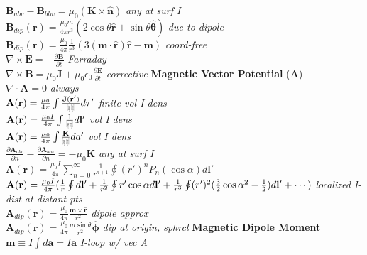 \documentclass[9pt]{extarticle}
\def\rcurs{{\mbox{$\resizebox{.09in}{.08in}{\texttt{[image: ScriptR]}}$}}}
\begin{document}
\begin{multicols}{3}
$\mathbf{B}_{abv} - \mathbf{B}_{blw} = \mu_{0}(\mathbf{K}\times\mathbf{\hat{n}})$ \textit{any at surf I} \\
$\mathbf{B}_{dip}(\mathbf{r}) = \frac{\mu_{0}m}{4\pi r^{3}}(2\cos{\theta}\mathbf{\hat{r}} + \sin{\theta}\mathbf{\hat{\theta}})$ \textit{due to dipole} \\
$\mathbf{B}_{dip}(\mathbf{r}) = \frac{\mu_{0}}{4\pi}\frac{1}{r^{3}}(3(\mathbf{m}\cdot\mathbf{\hat{r}})\mathbf{\hat{r}}-\mathbf{m})$ \textit{coord-free} \\
$\nabla\times\mathbf{E} = -\frac{\partial\mathbf{B}}{\partial t}$ \textit{Farraday} \\
$\nabla\times\mathbf{B}=\mu_{0}\mathbf{J}+\mu_{0}\epsilon_{0}\frac{\partial\mathbf{E}}{\partial t}$ \textit{corrective}
\textbf{Magnetic Vector Potential} ($\mathbf{A}$) \\
$\nabla\cdot\mathbf{A} = 0$ \textit{always} \\
$\mathbf{A}(\mathbf{r}) = \frac{\mu_{0}}{4\pi}\int\frac{\mathbf{J}(\mathbf{r}')}{\rcurs}d\tau '$ \textit{finite vol I dens} \\
$\mathbf{A}(\mathbf{r}) = \frac{\mu_{0}I}{4\pi}\int\frac{1}{\rcurs}d\mathbf{l}'$ \textit{vol I dens} \\
$\mathbf{A}(\mathbf{r}) = \frac{\mu_{0}}{4\pi}\int\frac{\mathbf{K}}{\rcurs}da '$ \textit{vol I dens} \\
$\frac{\partial\mathbf{A}_{abv}}{\partial n} - \frac{\partial\mathbf{A}_{blw}}{\partial n} = -\mu_{0}\mathbf{K}$ \textit{any at surf I} \\
$\mathbf{A}(\mathbf{r}) = \frac{\mu_{0}I}{4\pi}\sum_{n=0}^{\infty}\frac{1}{r^{n+1}}\oint(r')^{n}P_{n}(\cos{\alpha})d\mathbf{l}'$  \\
$\mathbf{A}(\mathbf{r}) = \frac{\mu_{0}I}{4\pi}(\frac{1}{r}\oint d\mathbf{l}' + \frac{1}{r^{2}} \oint r'\cos{\alpha}d\mathbf{l}' \\ + \frac{1}{r^{3}}\oint (r')^{2}(\frac{3}{2}\cos{\alpha}^{2}-\frac{1}{2})d\mathbf{l}' + \cdots)$ \textit{localized I-dist at distant pts} \\
$\mathbf{A}_{dip}(\mathbf{r}) = \frac{\mu_{0}}{4\pi}\frac{\mathbf{m}\times\mathbf{\hat{r}}}{r^{2}}$ \textit{dipole approx} \\
$\mathbf{A}_{dip}(\mathbf{r}) = \frac{\mu_{0}}{4\pi}\frac{m\sin{\theta}}{r^{2}}\mathbf{\hat{\phi}}$ \textit{dip at origin, sphrcl}
\textbf{Magnetic Dipole Moment} \\
$\mathbf{m} \equiv I\int d\mathbf{a} = I\mathbf{a}$ \textit{I-loop w/ vec A} \\

\end{multicols}
\end{document}
